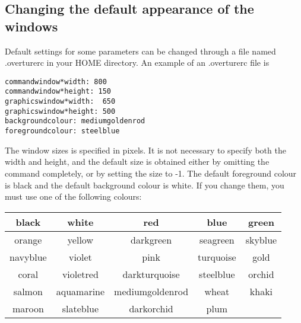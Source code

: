 \subsection{Changing the default appearance of the windows}

Default settings for some parameters can be changed through a file
named .overturerc in your HOME directory. An example of an
.overturerc file is
\begin{verbatim}
commandwindow*width: 800
commandwindow*height: 150
graphicswindow*width:  650
graphicswindow*height: 500
backgroundcolour: mediumgoldenrod
foregroundcolour: steelblue
\end{verbatim}
The window sizes is specified in pixels. It is not necessary to
specify both the width and height, and the default size is obtained
either by omitting the command completely, or by setting the size to
-1. The default foreground colour is black and the default background
colour is white. If you change them, you must use one of the
following colours:
\begin{center}
\begin{tabular}{c|c|c|c|c}
black    &  white     &  red            & blue      &  green   \\ \hline
orange   &  yellow    &  darkgreen      & seagreen  &  skyblue \\ \hline
navyblue &  violet    &  pink           & turquoise &  gold    \\ \hline
coral    &  violetred &  darkturquoise  & steelblue &  orchid  \\ \hline
salmon   & aquamarine & mediumgoldenrod & wheat     &  khaki   \\ \hline
maroon   &  slateblue & darkorchid      & plum      &
\end{tabular}
\end{center}

